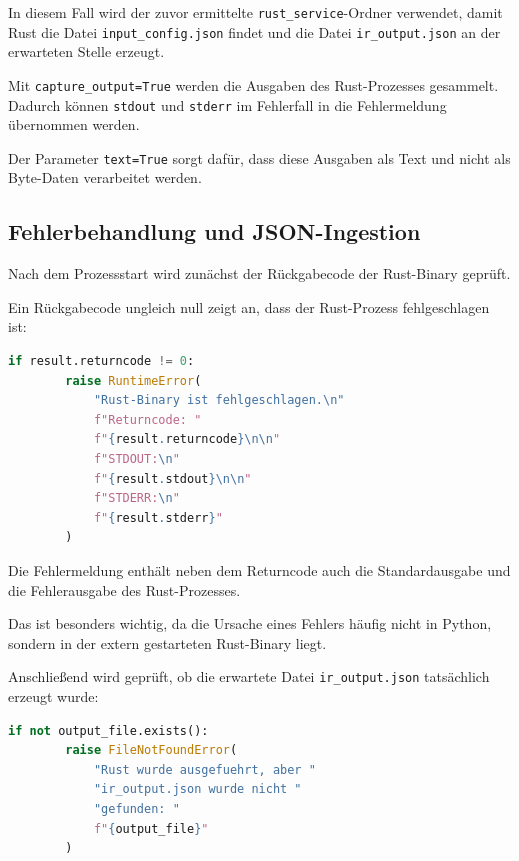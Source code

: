 \documentclass{article}
\begin{document}
    In diesem Fall wird der zuvor ermittelte
    \texttt{rust\_service}-Ordner verwendet, damit Rust die Datei
    \texttt{input\_config.json} findet und die Datei
    \texttt{ir\_output.json} an der erwarteten Stelle erzeugt.

    Mit \texttt{capture\_output=True} werden die Ausgaben des Rust-Prozesses
    gesammelt. Dadurch können \texttt{stdout} und \texttt{stderr} im Fehlerfall
    in die Fehlermeldung übernommen werden.

    Der Parameter \texttt{text=True} sorgt dafür, dass diese Ausgaben als Text
    und nicht als Byte-Daten verarbeitet werden.

    \subsection{Fehlerbehandlung und JSON-Ingestion}
    \label{subsec:error-handling-json}

    Nach dem Prozessstart wird zunächst der Rückgabecode der Rust-Binary geprüft.

    Ein Rückgabecode ungleich null zeigt an, dass der Rust-Prozess fehlgeschlagen
    ist:

    \begin{lstlisting}[language=Python]
    if result.returncode != 0:
        raise RuntimeError(
            "Rust-Binary ist fehlgeschlagen.\n"
            f"Returncode: "
            f"{result.returncode}\n\n"
            f"STDOUT:\n"
            f"{result.stdout}\n\n"
            f"STDERR:\n"
            f"{result.stderr}"
        )
    \end{lstlisting}

    Die Fehlermeldung enthält neben dem Returncode auch die Standardausgabe und die
    Fehlerausgabe des Rust-Prozesses.

    Das ist besonders wichtig, da die Ursache eines Fehlers häufig nicht in
    Python, sondern in der extern gestarteten Rust-Binary liegt.

    Anschließend wird geprüft, ob die erwartete Datei
    \texttt{ir\_output.json} tatsächlich erzeugt wurde:

    \begin{lstlisting}[language=Python]
    if not output_file.exists():
        raise FileNotFoundError(
            "Rust wurde ausgefuehrt, aber "
            "ir_output.json wurde nicht "
            "gefunden: "
            f"{output_file}"
        )
    \end{lstlisting}
\end{document}
